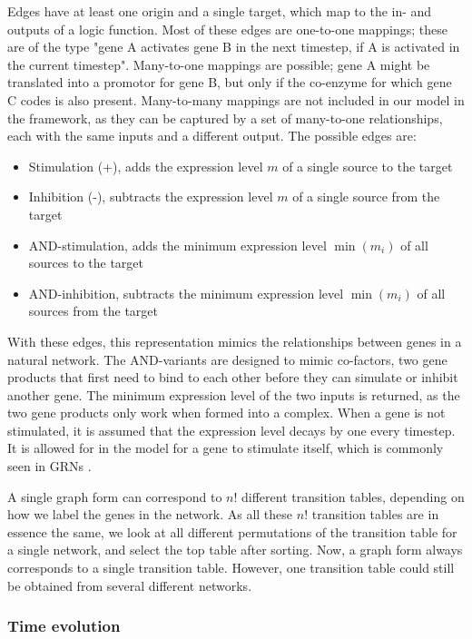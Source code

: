 \documentclass[../main.tex]{subfiles}
\begin{document}
Edges have at least one origin and a single target, which map to the in- and outputs of a logic function.
Most of these edges are one-to-one mappings; these are of the type "gene A activates gene B in the next timestep, if A is activated in the current timestep".
Many-to-one mappings are possible; gene A might be translated into a promotor for gene B, but only if the co-enzyme for which gene C codes is also present.
Many-to-many mappings are not included in our model in the framework, as they can be captured by a set of many-to-one relationships, each with the same inputs and a different output.
The possible edges are:
%
\begin{itemize}
\item Stimulation (+), adds the expression level $m$ of a single source to the target
\item Inhibition (-), subtracts the expression level $m$ of a single source from the target
\item AND-stimulation, adds the minimum expression level $\min(m_i)$ of all sources to the target
\item AND-inhibition, subtracts the minimum expression level $\min(m_i)$ of all sources from the target
\end{itemize}
%
With these edges, this representation mimics the relationships between genes in a natural network.
The AND-variants are designed to mimic co-factors, two gene products that first need to bind to each other before they can simulate or inhibit another gene.
The minimum expression level of the two inputs is returned, as the two gene products only work when formed into a complex.
When a gene is not stimulated, it is assumed that the expression level decays by one every timestep.
It is allowed for in the model for a gene to stimulate itself, which is commonly seen in GRNs \cite{thomas1995dynamical, zhou2016relative}.

A single graph form can correspond to $n!$ different transition tables, depending on how we label the genes in the network.
As all these $n!$ transition tables are in essence the same, we look at all different permutations of the transition table for a single network, and select the top table after sorting.
Now, a graph form always corresponds to a single transition table. 
However, one transition table could still be obtained from several different networks.

\subsubsection{Time evolution}
\end{document}
